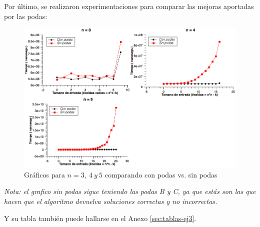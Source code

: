 Por último, se realizaron experimentaciones para comparar las mejoras aportadas por las podas:

\begin{figure}[H]
        \centering
        \includegraphics[width=\textwidth]{imagenes/grafico3-cmp-podas.png}
        \caption{Gráficos para $n=3,\ 4\ y\ 5$ comparando con podas vs. sin podas}
\end{figure}

\textit{Nota: el grafico sin podas sigue teniendo las podas B y C, ya que estás son las que hacen que el algoritmo devuelva soluciones correctas y no incorrectas.}

Y su tabla también puede hallarse en el Anexo  \ref{sec:tablas-ej3}.
